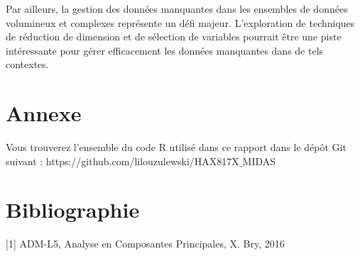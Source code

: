 \documentclass[12pt, openany, fleqn, french]{article}
\begin{document}
Par ailleurs, la gestion des données manquantes dans les ensembles de données volumineux et complexes représente un défi majeur. L'exploration de techniques de réduction de dimension et de sélection de variables pourrait être une piste intéressante pour gérer efficacement les données manquantes dans de tels contextes.
\newpage

\section{Annexe}

Vous trouverez l'ensemble du code R utilisé dans ce rapport dans le dépôt Git suivant : 
https://github.com/lilouzulewski/HAX817X$\_$MIDAS


\section{Bibliographie}

[1] ADM-L5, Analyse en Composantes Principales, X. Bry, 2016
\end{document}
